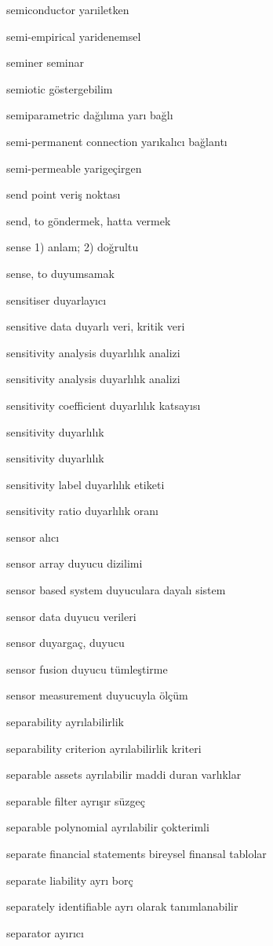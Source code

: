 \documentclass[12pt,fleqn]{article}\usepackage{../../common}
\begin{document}
semiconductor yarıiletken

semi-empirical yaridenemsel

seminer seminar

semiotic göstergebilim

semiparametric dağılıma yarı bağlı

semi-permanent connection yarıkalıcı bağlantı

semi-permeable yarigeçirgen

send point veriş noktası

send, to göndermek, hatta vermek

sense 1) anlam; 2) doğrultu

sense, to duyumsamak

sensitiser duyarlayıcı

sensitive data duyarlı veri, kritik veri

sensitivity analysis duyarlılık analizi

sensitivity analysis duyarlılık analizi

sensitivity coefficient duyarlılık katsayısı

sensitivity duyarlılık

sensitivity duyarlılık

sensitivity label duyarlılık etiketi

sensitivity ratio duyarlılık oranı

sensor alıcı

sensor array duyucu dizilimi

sensor based system duyuculara dayalı sistem

sensor data duyucu verileri

sensor duyargaç, duyucu

sensor fusion duyucu tümleştirme

sensor measurement duyucuyla ölçüm

separability ayrılabilirlik

separability criterion ayrılabilirlik kriteri

separable assets ayrılabilir maddi duran varlıklar

separable filter ayrışır süzgeç

separable polynomial ayrılabilir çokterimli

separate financial statements bireysel finansal tablolar

separate liability ayrı borç

separately identifiable ayrı olarak tanımlanabilir

separator ayırıcı
\end{document}
